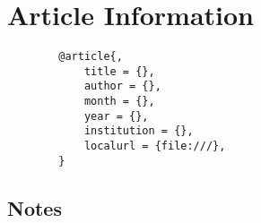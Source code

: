 \documentclass[10pt]{article}
\newcommand{\atitle}[1]{\renewcommand{\atitle}{#1}}
\newcommand{\acitation}[1]{\renewcommand{\acitation}{#1}}
\begin{document}
\section*{Article Information}
\atitle{}
\acitation{}

	\begin{framed}
		\begin{verbatim}
		@article{,
			title = {},
			author = {},
			month = {},
			year = {},
			institution = {},
			localurl = {file:///},
		}
		\end{verbatim}
	\end{framed}


\begin{multicols}{2}

\section*{Notes}



\nocite{*}


\end{multicols}
\end{document}
